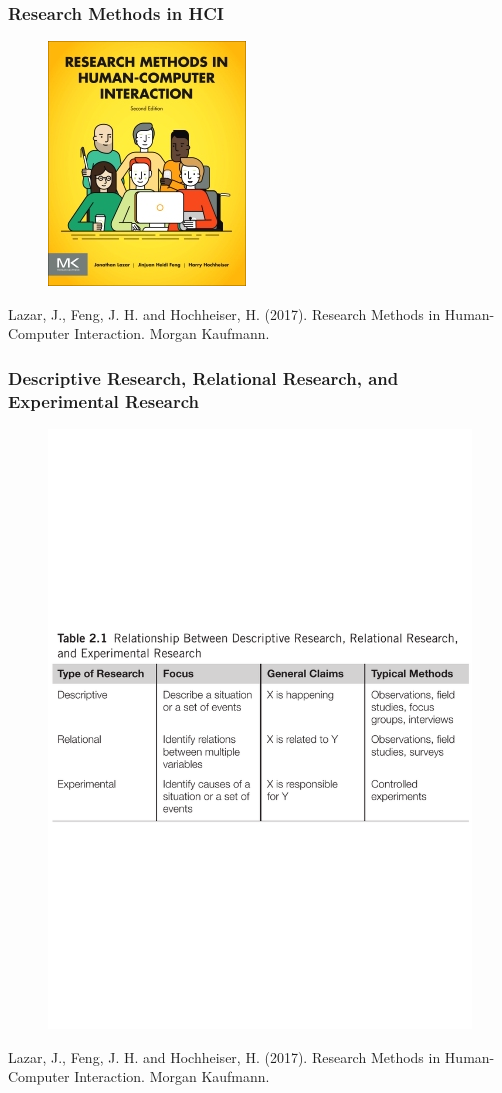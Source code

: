 \documentclass[screen, aspectratio=169]{beamer}
\begin{document}
\begin{frame}
\frametitle{Research Methods in HCI}
 \begin{figure}
	\includegraphics[scale=1.7]{img/Lazar-Research-Methods-HCI.jpg}
    \end{figure}
   Lazar, J., Feng, J. H. and Hochheiser, H. (2017). Research Methods in Human-Computer Interaction. Morgan Kaufmann. \cite{Lazar.et.al.2017.research}
\end{frame}
%
\begin{frame}
\frametitle{Descriptive Research, Relational Research, and Experimental Research}
 \begin{figure}
	\includegraphics[scale=0.5]{img/Lazar-relationships-research.pdf}
    \end{figure}
   Lazar, J., Feng, J. H. and Hochheiser, H. (2017). Research Methods in Human-Computer Interaction. Morgan Kaufmann. \cite[p.27]{Lazar.et.al.2017.research}
\end{frame}
\end{document}

